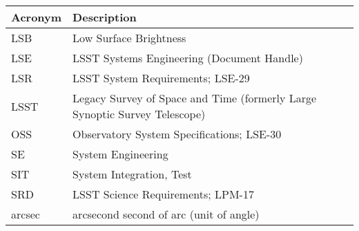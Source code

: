 \addtocounter{table}{-1}
\begin{longtable}{p{}p{}}\hline
\textbf{Acronym} & \textbf{Description}  \\\hline

LSB & Low Surface Brightness \\\hline
LSE & LSST Systems Engineering (Document Handle) \\\hline
LSR & LSST System Requirements; LSE-29 \\\hline
LSST & Legacy Survey of Space and Time (formerly Large Synoptic Survey Telescope) \\\hline
OSS & Observatory System Specifications; LSE-30 \\\hline
SE & System Engineering \\\hline
SIT & System Integration, Test \\\hline
SRD & LSST Science Requirements; LPM-17 \\\hline
arcsec & arcsecond second of arc (unit of angle) \\\hline
\end{longtable}
